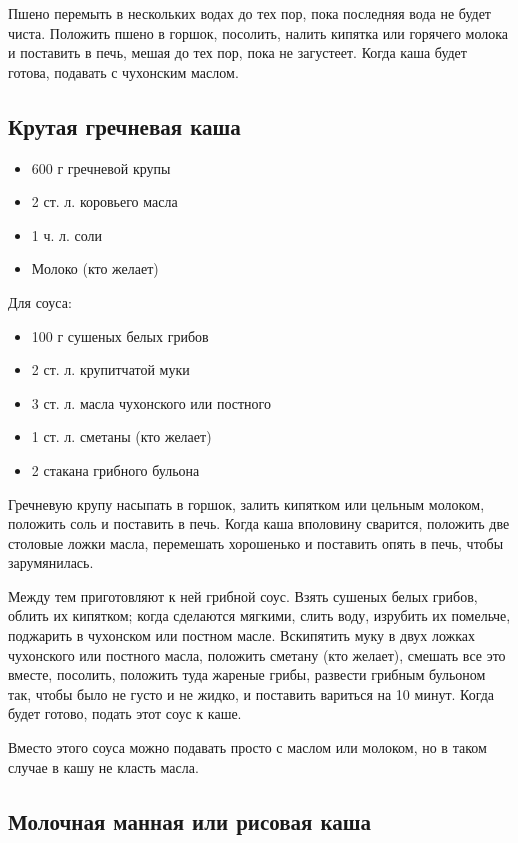 Пшено перемыть в нескольких водах до тех пор, пока последняя вода не будет чиста. Положить пшено в горшок, посолить, налить кипятка или горячего молока и поставить в печь, мешая до тех пор, пока не загустеет. Когда каша будет готова, подавать с чухонским маслом.

\subsection{Крутая гречневая каша}

\begin{itemize}
	\item 600 г гречневой крупы 
    \item 2 ст. л. коровьего масла 
    \item 1 ч. л. соли 
    \item Молоко (кто желает)
\end{itemize}

Для соуса: 

\begin{itemize}
	\item 100 г сушеных белых грибов 
    \item 2 ст. л. крупитчатой муки 
    \item 3 ст. л. масла чухонского или постного 
    \item 1 ст. л. сметаны (кто желает) 
    \item 2 стакана грибного бульона
\end{itemize}

Гречневую крупу насыпать в горшок, залить кипятком или цельным молоком, положить соль и поставить в печь. Когда каша вполовину сварится, положить две столовые ложки масла, перемешать хорошенько и поставить опять в печь, чтобы зарумянилась.

Между тем приготовляют к ней грибной соус. Взять сушеных белых грибов, облить их кипятком; когда сделаются мягкими, слить воду, изрубить их помельче, поджарить в чухонском или постном масле. Вскипятить муку в двух ложках чухонского или постного масла, положить сметану (кто желает), смешать все это вместе, посолить, положить туда жареные грибы, развести грибным бульоном так, чтобы было не густо и не жидко, и поставить вариться на 10 минут. Когда будет готово, подать этот соус к каше.

Вместо этого соуса можно подавать просто с маслом или молоком, но в таком случае в кашу не класть масла.

\subsection{Молочная манная или рисовая каша}\label{sec:kasha-rec3}

